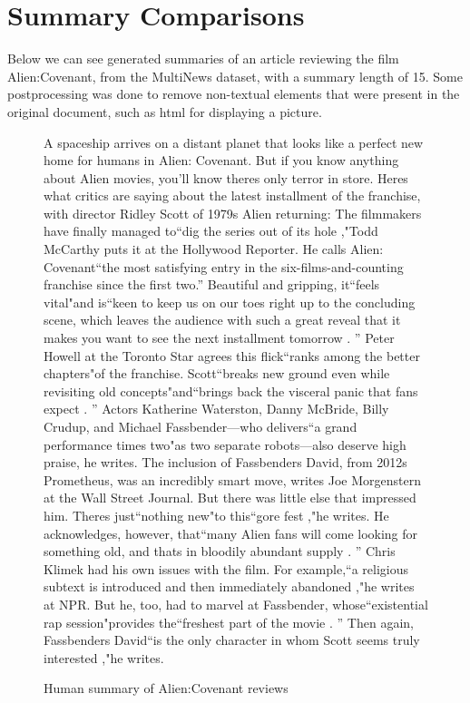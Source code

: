 \documentclass[../writeup.tex]{subfiles}
\begin{document}
\section{Summary Comparisons}\label{sam:sec:summary_comparison}

Below we can see generated summaries of an article reviewing the film Alien:Covenant, from the MultiNews dataset, with a summary length of 15. Some postprocessing was done to remove non-textual elements that were present in the original document, such as html for displaying a picture.
\begin{figure}[h]
    {\small A spaceship arrives on a distant planet that looks like a perfect new home for humans in Alien: Covenant.
        But if you know anything about Alien movies, you'll know theres only terror in store.
        Heres what critics are saying about the latest installment of the franchise, with director Ridley Scott of 1979s Alien returning: The filmmakers have finally managed to``dig the series out of its hole ,"Todd McCarthy puts it at the Hollywood Reporter.
        He calls Alien: Covenant``the most satisfying entry in the six-films-and-counting franchise since the first two.''
        Beautiful and gripping, it``feels vital"and is``keen to keep us on our toes right up to the concluding scene, which leaves the audience with such a great reveal that it makes you want to see the next installment tomorrow . ''
        Peter Howell at the Toronto Star agrees this flick``ranks among the better chapters"of the franchise.
        Scott``breaks new ground even while revisiting old concepts"and``brings back the visceral panic that fans expect . ''
        Actors Katherine Waterston, Danny McBride, Billy Crudup, and Michael Fassbender—who delivers``a grand performance times two"as two separate robots—also deserve high praise, he writes.
        The inclusion of Fassbenders David, from 2012s Prometheus, was an incredibly smart move, writes Joe Morgenstern at the Wall Street Journal.
        But there was little else that impressed him. Theres just``nothing new"to this``gore fest ,"he writes.
        He acknowledges, however, that``many Alien fans will come looking for something old, and thats in bloodily abundant supply . ''
        Chris Klimek had his own issues with the film.
        For example,``a religious subtext is introduced and then immediately abandoned ,"he writes at NPR.
        But he, too, had to marvel at Fassbender, whose``existential rap session"provides the``freshest part of the movie . ''
        Then again, Fassbenders David``is the only character in whom Scott seems truly interested ,"he writes.}
    \caption{Human summary of Alien:Covenant reviews}
\end{figure}
\end{document}
